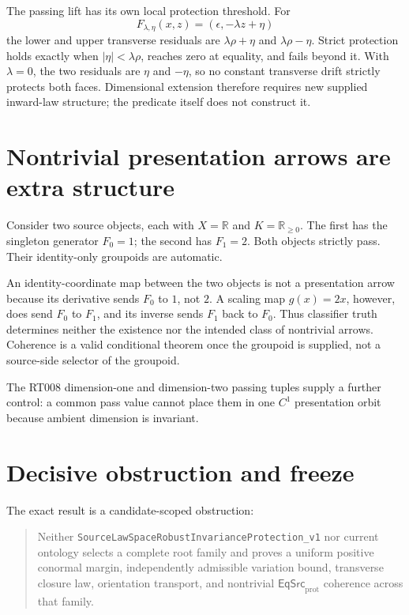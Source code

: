 \documentclass[11pt]{article}
\newcommand{\R}{\mathbb R}
\newcommand{\EqSrc}{\mathsf{EqSrc}_{\mathrm{prot}}}
\begin{document}
The passing lift has its own local protection threshold.  For
\[
 F_{\lambda,\eta}(x,z)=(\epsilon,-\lambda z+\eta)
\]
the lower and upper transverse residuals are
\(\lambda\rho+\eta\) and \(\lambda\rho-\eta\).  Strict protection holds
exactly when \(|\eta|<\lambda\rho\), reaches zero at equality, and fails
beyond it.  With \(\lambda=0\), the two residuals are \(\eta\) and
\(-\eta\), so no constant transverse drift strictly protects both faces.
Dimensional extension therefore requires new supplied inward-law structure;
the predicate itself does not construct it.

\section{Nontrivial presentation arrows are extra structure}

Consider two source objects, each with \(X=\R\) and \(K=\R_{\geq0}\).
The first has the singleton generator \(F_0=1\); the second has
\(F_1=2\).  Both objects strictly pass.  Their identity-only groupoids are
automatic.

An identity-coordinate map between the two objects is not a presentation
arrow because its derivative sends \(F_0\) to \(1\), not \(2\).  A scaling
map \(g(x)=2x\), however, does send \(F_0\) to \(F_1\), and its inverse sends
\(F_1\) back to \(F_0\).  Thus classifier truth determines neither the
existence nor the intended class of nontrivial arrows.  Coherence is a valid
conditional theorem once the groupoid is supplied, not a source-side selector
of the groupoid.

The RT008 dimension-one and dimension-two passing tuples supply a further
control: a common pass value cannot place them in one \(C^1\) presentation
orbit because ambient dimension is invariant.

\section{Decisive obstruction and freeze}

The exact result is a candidate-scoped obstruction:
\begin{quote}
Neither \texttt{SourceLawSpaceRobustInvarianceProtection\_v1} nor current
ontology selects a complete root family and proves a uniform positive
conormal margin, independently admissible variation bound, transverse closure
law, orientation transport, and nontrivial \(\EqSrc\) coherence across that
family.
\end{quote}
\end{document}
